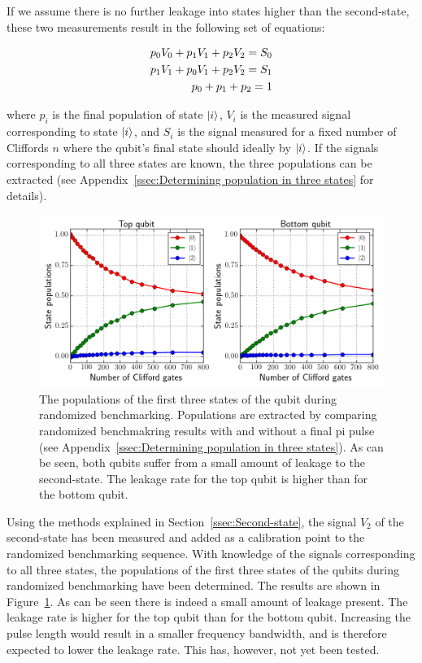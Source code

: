         If we assume there is no further leakage into states higher than the second-state, these two measurements result in the following set of equations:

        \begin{align}
          p_0 V_0 + p_1 V_1 + p_2 V_2 = S_0 \notag\\
          p_1 V_1 + p_0 V_1 + p_2 V_2 = S_1 \notag\\
          p_0 + p_1 + p_2 = 1
          \label{eq:three populations equations}
        \end{align}

        where $p_i$ is the final population of state $\ket{i}$, $V_i$ is the measured signal corresponding to state $\ket{i}$, and $S_i$ is the signal measured for a fixed number of Cliffords $n$ where the qubit's final state should ideally by $\ket{i}$. If the signals corresponding to all three states are known, the three populations can be extracted (see Appendix~\ref{ssec:Determining population in three states} for details).

        \begin{figure}[tb]
          \centering
          \includegraphics[width=\textwidth]{../Figures/Randomized benchmarking/RB_normal_state_populations.png}
          \caption{The populations of the first three states of the qubit during randomized benchmarking. Populations are extracted by comparing randomized benchmakring results with and without a final pi pulse (see Appendix~\ref{ssec:Determining population in three states}). As can be seen, both qubits suffer from a small amount of leakage to the second-state. The leakage rate for the top qubit is higher than for the bottom qubit.}
          \label{fig:RB normal state populations}
        \end{figure}

        Using the methods explained in Section~\ref{ssec:Second-state}, the signal $V_2$ of the second-state has been measured and added as a calibration point to the randomized benchmarking sequence. With knowledge of the signals corresponding to all three states, the populations of the first three states of the qubits during randomized benchmarking have been determined. The results are shown in Figure~\ref{fig:RB normal state populations}. As can be seen there is indeed a small amount of leakage present. The leakage rate is higher for the top qubit than for the bottom qubit. Increasing the pulse length would result in a smaller frequency bandwidth, and is therefore expected to lower the leakage rate. This has, however, not yet been tested.


